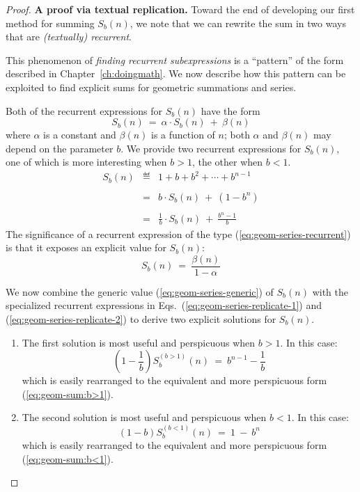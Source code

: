 \begin{proof}
{\bf A proof via textual replication.}
Toward the end of developing our first method for summing $S_{b}(n)$, we note that we can rewrite the sum in two ways that are {\em (textually) recurrent}.

\bigskip

\noindent
This phenomenon of {\em finding recurrent subexpressions} is a ``pattern'' of the form described in Chapter~\ref{ch:doingmath}.  We now describe how this pattern can be exploited to find explicit sums for geometric summations and series.

\bigskip

\noindent
Both of the recurrent expressions for $S_{b}(n)$ have the form
\begin{equation}
\label{eq:geom-series-recurrent}
S_b(n) \ = \ \alpha \cdot S_b(n) \ + \ \beta(n)
\end{equation}
where $\alpha$ is a constant and $\beta(n)$ is a function of $n$; both $\alpha$ and $\beta(n)$ may depend on the parameter $b$.  We provide two recurrent expressions for $S_b(n)$, one of which is more interesting when $b>1$, the other when $b<1$.
\begin{eqnarray}
\label{eq:geom-series-replicate}
\nonumber
S_{b}(n) 
  & \eqdef &
1+ b + b^2 + \cdots + b^{n-1}  \\
\nonumber
  &   &  \\
\label{eq:geom-series-replicate-1}
   & = & b \cdot S_{b}(n) \ + \ (1 - b^n) \\
\nonumber
   &  & \\
\label{eq:geom-series-replicate-2}
  & = &
\frac{1}{b} \cdot S_{b}(n) \ + \ \frac{b^n -1}{b} 
\end{eqnarray}
The significance of a recurrent expression of the type (\ref{eq:geom-series-recurrent}) is that it exposes an explicit value for $S_b(n)$:
\begin{equation}
\label{eq:geom-series-generic}
S_b(n) \ = \ \frac{\beta(n)}{1 - \alpha}
\end{equation}

\medskip

We now combine the generic value (\ref{eq:geom-series-generic}) of $S_b(n)$ with the specialized recurrent expressions in Eqs.~(\ref{eq:geom-series-replicate-1}) and (\ref{eq:geom-series-replicate-2}) to derive two explicit solutions for $S_b(n)$.
\begin{enumerate}
\item
The first solution is most useful and perspicuous when $b>1$.  In this case:
\[ \left( 1 - \frac{1}{b} \right)  S^{(b>1)}_{b}(n) \ = \ b^{n-1} - \frac{1}{b} \]
which is easily rearranged to the equivalent and more perspicuous form (\ref{eq:geom-sum:b>1}).

\medskip\item
The second solution is most useful and perspicuous when $b < 1$.  In this case:
\[ (1-b) S^{(b<1)}_{b}(n) \ = \ 1 \ - \ b^n \]
which is easily rearranged to the equivalent and more perspicuous form (\ref{eq:geom-sum:b<1}).
\end{enumerate}
\end{proof}

